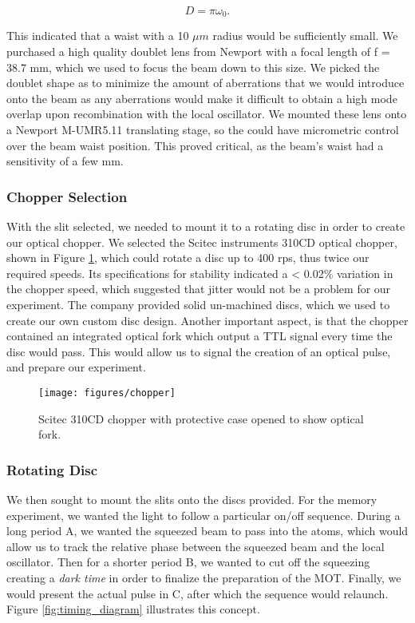 \begin{equation}
  \label{eq:siegman_diffraction}
  D = \pi \omega_0.
\end{equation}

This indicated that a waist with a 10 $\mu m$ radius would be sufficiently small. We purchased a high quality doublet lens from Newport with a focal length of f = 38.7 mm, which we used to focus the beam down to this size.   We picked the doublet shape as to minimize the amount of aberrations that we would introduce onto the beam as any aberrations would make it difficult to obtain a high mode overlap  upon recombination with the local oscillator.  We mounted these lens onto a Newport M-UMR5.11 translating stage, so the could have micrometric control over the beam waist position.  This proved critical, as the beam's waist had a sensitivity of a few mm.

\subsubsection{Chopper Selection}
\label{chopper_selection} 

With the slit selected, we needed to mount it to a rotating disc in order to create our optical chopper.  We selected the Scitec instruments 310CD optical chopper, shown in Figure \ref{fig:chopper_open}, which could rotate a disc up to 400 rps, thus twice our required speeds.  Its specifications for stability indicated a < 0.02\% variation in the chopper speed, which suggested that jitter would not be a problem for our experiment.  The company provided solid un-machined discs, which we used to create our own custom disc design.  Another important aspect, is that the chopper contained an integrated optical fork which output a TTL signal every time the disc would pass.  This would allow us to signal the creation of an optical pulse, and prepare our experiment.

\begin{figure}[!ht] 
 \centering 
 \texttt{[image: figures/chopper]} 
 \caption[Scitec 310CD Chopper]{Scitec 310CD chopper with protective case opened to show optical fork.} 
 \label{fig:chopper_open} 
\end{figure}


\subsubsection{Rotating Disc}
\label{rotating_disc} 

We then sought to mount the slits onto the discs provided.  For the memory experiment, we wanted the light to follow a particular on/off sequence.  During a long period A, we wanted the squeezed beam to pass into the atoms, which would allow us to track the relative phase between the squeezed beam and the local oscillator.  Then for a shorter period B, we wanted to cut off the squeezing creating a \emph{dark time} in order to finalize the preparation of the MOT.  Finally, we would present the actual pulse in C, after which the sequence would relaunch.  Figure \ref{fig:timing_diagram} illustrates this concept.


